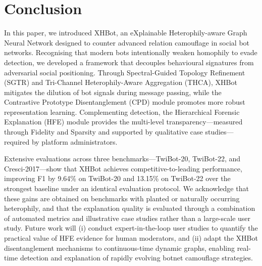 \section{Conclusion}

In this paper, we introduced XHBot, an eXplainable Heterophily-aware Graph Neural Network designed to counter advanced relation camouflage in social bot networks. Recognising that modern bots intentionally weaken homophily to evade detection, we developed a framework that decouples behavioural signatures from adversarial social positioning. Through Spectral-Guided Topology Refinement (SGTR) and Tri-Channel Heterophily-Aware Aggregation (THCA), XHBot mitigates the dilution of bot signals during message passing, while the Contrastive Prototype Disentanglement (CPD) module promotes more robust representation learning. Complementing detection, the Hierarchical Forensic Explanation (HFE) module provides the multi-level transparency---measured through Fidelity and Sparsity and supported by qualitative case studies---required by platform administrators.

Extensive evaluations across three benchmarks---TwiBot-20, TwiBot-22, and Cresci-2017---show that XHBot achieves competitive-to-leading performance, improving F1 by 9.64\% on TwiBot-20 and 13.15\% on TwiBot-22 over the strongest baseline under an identical evaluation protocol. We acknowledge that these gains are obtained on benchmarks with planted or naturally occurring heterophily, and that the explanation quality is evaluated through a combination of automated metrics and illustrative case studies rather than a large-scale user study. Future work will (i) conduct expert-in-the-loop user studies to quantify the practical value of HFE evidence for human moderators, and (ii) adapt the XHBot disentanglement mechanisms to continuous-time dynamic graphs, enabling real-time detection and explanation of rapidly evolving botnet camouflage strategies.
